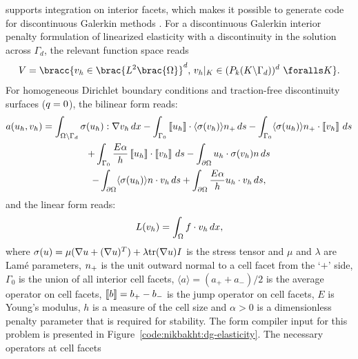 \ffc{} supports integration on interior facets, which makes
it possible to generate code for discontinuous Galerkin methods
\citep{OelgaardLoggWells2008}.  For a discontinuous Galerkin interior
penalty formulation of linearized elasticity with a discontinuity in
the solution across $\Gamma_{d}$, the relevant function space reads
%
\begin{equation}
 V = \bracc{\vect{v}_{h} \in \brac{L^{2}\brac{\Omega}}^{d}, \,
            \vect{v}_{h}|_K \in (P_{k}(K\backslash\Gamma_{d}))^{d} \ \foralls K}.
\end{equation}
%
For homogeneous Dirichlet boundary conditions and traction-free
discontinuity surfaces ($q = 0$), the bilinear form reads:
%
\begin{multline}
 a(u_{h}, v_{h}) = \int_{\Omega \backslash \Gamma_{d}} \sigma(u_{h})
                                :  \nabla v_{h} \, d x
 -  \int_{\Gamma_0} \left\llbracket {u_{h}} \right\rrbracket \cdot \langle \sigma(v_{h}) \rangle n_{+} \, d s
 - \int_{\Gamma_{0}} \langle \sigma(u_{h}) \rangle n_{+} \cdot \left\llbracket {v_{h}} \right\rrbracket  \, d s
\\
 + \int_{\Gamma_0} \frac{E \alpha}{h}  \left\llbracket {u_{h}} \right\rrbracket \cdot \left\llbracket {v_{h}} \right\rrbracket \, d s
 -  \int_{\partial \Omega} u_{h} \cdot \sigma(v_{h})n \, d s
\\
 - \int_{\partial \Omega} \langle \sigma(u_{h}) \rangle n \cdot v_{h}  \, d s
 + \int_{\partial \Omega} \frac{E \alpha}{h}  u_{h} \cdot v_{h} \, d s,
\end{multline}
%
and the linear form reads:
%
\begin{equation}
 L(v_{h}) = \int_{\Omega} f \cdot v_{h} \, d x,
\end{equation}
%
where
$\sigma(u)
= \mu(\nabla u + (\nabla u)^{T} )
+ \lambda {\rm tr}(\nabla u) I$
is the stress tensor and $\mu$ and $\lambda$ are Lam\'e parameters,
$n_{+}$ is the unit outward normal to a cell facet from the `$+$' side,
$\Gamma_0$ is the union of all interior cell facets,
$\langle a \rangle = (a_{+} + a_{-})/2$ is the  average operator on cell facets,
$\left\llbracket {b} \right\rrbracket = b_{+} - b_{-}$ is the jump operator on cell facets,
$E$ is Young's modulus, $h$ is a measure of the cell size
and $\alpha > 0$ is a dimensionless penalty parameter that
is required for stability.
The form compiler input for this problem is presented in
Figure~\ref{code:nikbakht:dg-elasticity}. The necessary operators at cell facets
